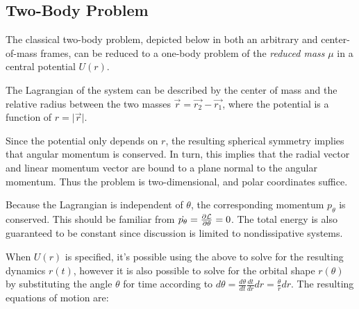 \subsection{Two-Body Problem}
The classical two-body problem, depicted below in both an arbitrary and center-of-mass frames, can be reduced to a one-body problem of the \textit{reduced mass} $\mu$ in a central potential $U(r)$.

The Lagrangian of the system can be described by the center of mass and the relative radius between the two masses $\vec{r} = \vec{r_2} - \vec{r_1}$, where the potential is a function of $r = \lvert\vec{r}\rvert$.

Since the potential only depends on $r$, the resulting spherical symmetry implies that angular momentum is conserved. In turn, this implies that the radial vector and linear momentum vector are bound to a plane normal to the angular momentum. Thus the problem is two-dimensional, and polar coordinates suffice. 

Because the Lagrangian is independent of $\theta$, the corresponding momentum $p_{\theta}$ is conserved. This should be familiar from $\dot{p_{\theta}} = \pd{\Lag}{\theta} = 0$. The total energy is also guaranteed to be constant since discussion is limited to nondissipative systems.

When $U(r)$ is specified, it's possible using the above to solve for the resulting dynamics $r(t)$, however it is also possible to solve for the orbital shape $r(\theta)$ by substituting the angle $\theta$ for time according to $d\theta = \frac{d\theta}{dt}\frac{dt}{dr}dr = \frac{\dot{\theta}}{\dot{r}}dr$. The resulting equations of motion are:


